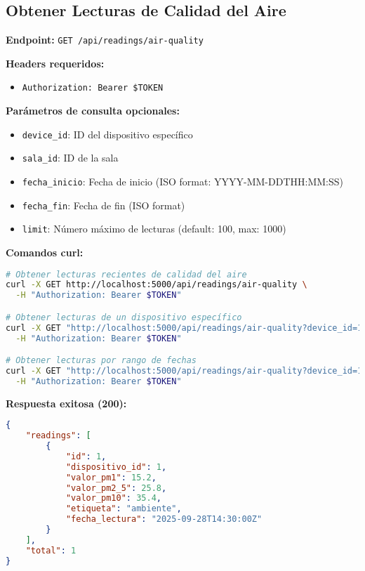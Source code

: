 \documentclass[12pt,a4paper]{article}
\begin{document}
\subsection{Obtener Lecturas de Calidad del Aire}

\textbf{Endpoint:} \texttt{GET /api/readings/air-quality}

\textbf{Headers requeridos:}
\begin{itemize}
\item \texttt{Authorization: Bearer \$TOKEN}
\end{itemize}

\textbf{Parámetros de consulta opcionales:}
\begin{itemize}
\item \texttt{device\_id}: ID del dispositivo específico
\item \texttt{sala\_id}: ID de la sala
\item \texttt{fecha\_inicio}: Fecha de inicio (ISO format: YYYY-MM-DDTHH:MM:SS)
\item \texttt{fecha\_fin}: Fecha de fin (ISO format)
\item \texttt{limit}: Número máximo de lecturas (default: 100, max: 1000)
\end{itemize}

\textbf{Comandos curl:}
\begin{lstlisting}[language=bash]
# Obtener lecturas recientes de calidad del aire
curl -X GET http://localhost:5000/api/readings/air-quality \
  -H "Authorization: Bearer $TOKEN"

# Obtener lecturas de un dispositivo específico
curl -X GET "http://localhost:5000/api/readings/air-quality?device_id=1&limit=50" \
  -H "Authorization: Bearer $TOKEN"

# Obtener lecturas por rango de fechas
curl -X GET "http://localhost:5000/api/readings/air-quality?device_id=1&fecha_inicio=2025-09-28T00:00:00&fecha_fin=2025-09-28T23:59:59" \
  -H "Authorization: Bearer $TOKEN"
\end{lstlisting}

\textbf{Respuesta exitosa (200):}
\begin{lstlisting}[language=JSON]
{
    "readings": [
        {
            "id": 1,
            "dispositivo_id": 1,
            "valor_pm1": 15.2,
            "valor_pm2_5": 25.8,
            "valor_pm10": 35.4,
            "etiqueta": "ambiente",
            "fecha_lectura": "2025-09-28T14:30:00Z"
        }
    ],
    "total": 1
}
\end{lstlisting}
\end{document}
